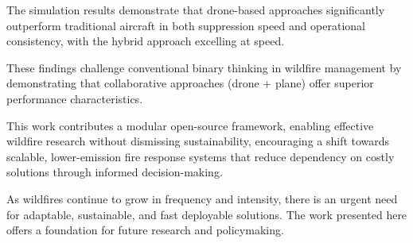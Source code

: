 \documentclass[11pt, a4paper]{article}
\begin{document}
The simulation results demonstrate that drone-based approaches significantly outperform traditional aircraft in both suppression speed and operational consistency, with the hybrid approach excelling at speed.

These findings challenge conventional binary thinking in wildfire management by demonstrating that collaborative approaches (drone + plane) offer superior performance characteristics.

This work contributes a modular open-source framework, enabling effective wildfire research without dismissing sustainability, encouraging a shift towards scalable, lower-emission fire response systems that reduce dependency on costly solutions through informed decision-making.

As wildfires continue to grow in frequency and intensity, there is an urgent need for adaptable, sustainable, and fast deployable solutions. The work presented here offers a foundation for future research and policymaking.



\end{document}
